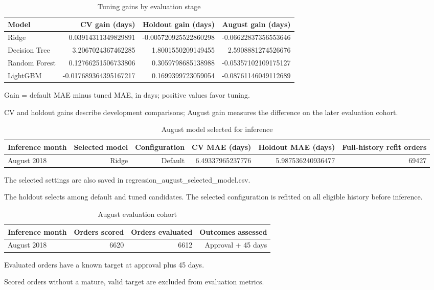 \begin{table}[htbp]
\centering
\small
\caption{Tuning gains by evaluation stage}
\begin{tabular}{lrrr}
\toprule
Model & CV gain (days) & Holdout gain (days) & August gain (days) \\
\midrule
Ridge & 0.03914311349829891 & -0.005720925522860298 & -0.06622837356553646 \\
Decision Tree & 3.2067024367462285 & 1.8001550209149455 & 2.5908881274526676 \\
Random Forest & 0.12766251506733806 & 0.3059798685138988 & -0.05357102109175127 \\
LightGBM & -0.017689364395167217 & 0.1699399723059054 & -0.08761146049112689 \\
\bottomrule
\end{tabular}
\par\smallskip\begin{minipage}{\linewidth}\footnotesize Gain = default MAE minus tuned MAE, in days; positive values favor tuning.\end{minipage}
\end{table}
CV and holdout gains describe development comparisons; August gain measures the difference on the later evaluation cohort.

\begin{table}[htbp]
\centering
\small
\caption{August model selected for inference}
\begin{tabular}{lrrrrr}
\toprule
Inference month & Selected model & Configuration & CV MAE (days) & Holdout MAE (days) & Full-history refit orders \\
\midrule
August 2018 & Ridge & Default & 6.49337965237776 & 5.987536240936477 & 69427 \\
\bottomrule
\end{tabular}
\par\smallskip\begin{minipage}{\linewidth}\footnotesize The selected settings are also saved in regression\_august\_selected\_model.csv.\end{minipage}
\end{table}
The holdout selects among default and tuned candidates. The selected configuration is refitted on all eligible history before inference.

\begin{table}[htbp]
\centering
\small
\caption{August evaluation cohort}
\begin{tabular}{lrrr}
\toprule
Inference month & Orders scored & Orders evaluated & Outcomes assessed \\
\midrule
August 2018 & 6620 & 6612 & Approval + 45 days \\
\bottomrule
\end{tabular}
\par\smallskip\begin{minipage}{\linewidth}\footnotesize Evaluated orders have a known target at approval plus 45 days.\end{minipage}
\end{table}
Scored orders without a mature, valid target are excluded from evaluation metrics.
